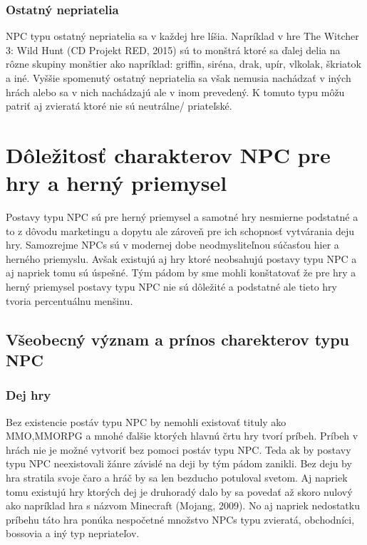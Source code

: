 \documentclass[10pt,twoside,slovak,a4paper]{article}
\begin{document}
\subsubsection{Ostatný nepriatelia} \label{Ostatny_nepriatelia}
NPC typu ostatný nepriatelia sa v každej hre líšia. Napríklad v hre The Witcher 3: Wild Hunt (CD Projekt RED, 2015) sú to monštrá ktoré sa ďalej delia na rôzne skupiny monštier ako napríklad: griffin, siréna, drak, upír, vlkolak, škriatok a iné.  Vyššie spomenutý ostatný nepriatelia sa však nemusia nachádzať v iných hrách alebo sa v nich nachádzajú ale v inom prevedený. K tomuto typu môžu patriť aj zvieratá ktoré nie sú neutrálne/ priateľské.


\section{Dôležitosť charakterov NPC pre hry a herný priemysel}   \label{Dolezitost}

Postavy typu NPC sú pre herný priemysel a samotné hry nesmierne podstatné a to z dôvodu marketingu a dopytu ale zároveň pre ich schopnosť vytvárania deju hry. Samozrejme NPCs sú v modernej dobe neodmysliteľnou súčasťou hier a herného priemyslu. Avšak existujú aj hry ktoré neobsahujú postavy typu NPC a aj napriek tomu sú úspešné. Tým pádom by sme mohli konštatovať že pre hry a herný priemysel postavy typu NPC nie sú dôležité a podstatné ale tieto hry tvoria percentuálnu menšinu.%

\subsection{Všeobecný význam a prínos charekterov typu NPC}

\subsubsection{Dej hry}
Bez existencie postáv typu NPC by nemohli existovať tituly ako MMO,MMORPG a mnohé ďalšie 
ktorých hlavnú črtu hry tvorí príbeh. Príbeh v hrách nie je možné vytvoriť bez pomoci postáv typu NPC. 
Teda ak by postavy typu NPC neexistovali žánre závislé na deji by tým pádom zanikli. 
Bez deju by hra stratila svoje čaro a hráč by sa len bezducho potuloval svetom. Aj napriek tomu 
existujú hry ktorých dej je druhoradý dalo by sa povedať až skoro nulový ako 
napríklad hra s názvom Minecraft (Mojang, 2009). No aj napriek nedostatku príbehu 
táto hra ponúka nespočetné množstvo NPCs typu zvieratá, obchodníci, bossovia a iný typ nepriateľov.
\end{document}
